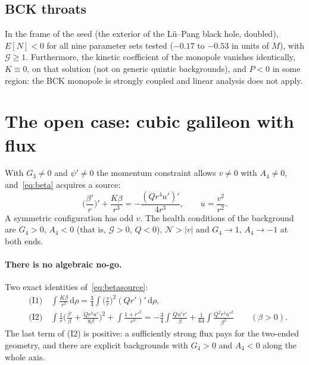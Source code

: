 \documentclass[11pt,a4paper]{article}
\theoremstyle{remark}
\newcommand{\G}{\mathcal G}
\newcommand{\Ncal}{\mathcal N}
\newcommand{\dd}{\mathrm d}
\begin{document}
\subsection{BCK throats}\label{sec:BCK}

In the frame of the seed (the exterior of the Lü--Pang black hole, doubled), $E[N]<0$ for all nine parameter sets tested ($-0.17$ to $-0.53$ in units of $M$), with $\G\ge1$. Furthermore, the kinetic coefficient of the monopole vanishes identically, $K\equiv0$, on that solution (not on generic quintic backgrounds), and $P<0$ in some region: the BCK monopole is strongly coupled and linear analysis does not apply.

\section{The open case: cubic galileon with flux}\label{sec:cubic}

With $G_3\neq0$ and $\psi'\neq0$ the momentum constraint allows $v\neq0$ with $A_4\neq0$, and~\eqref{eq:beta} acquires a source:
\begin{equation}
\Big(\frac{\beta'}r\Big)'+\frac{K\beta}{r^3}=-\frac{(Qr^4u')'}{4r^3},\qquad u=\frac{v^2}{r^2}.
\label{eq:betasource}
\end{equation}
A symmetric configuration has odd $v$. The health conditions of the background are $G_4>0$, $A_4<0$ (that is, $\G>0$, $Q<0$), $\Ncal>|v|$ and $G_4\to1$, $A_4\to-1$ at both ends.

\paragraph{There is no algebraic no-go.} Two exact identities of~\eqref{eq:betasource}:
\begin{align}
&\text{(I1)}\quad \int\frac{K\beta}{r^3}\,\dd\rho=\frac34\int\Big(\frac vr\Big)^2(Qr')'\,\dd\rho,\\
&\text{(I2)}\quad \int\frac1r\Big(\frac{\beta'}\beta+\frac{Qr^2u'}{8\beta}\Big)^2+\int\frac{1+r'^2}{r^3}=-\frac34\int\frac{Qu'r'}\beta+\frac1{64}\int\frac{Q^2r^3u'^2}{\beta^2}\qquad(\beta>0).
\end{align}
The last term of (I2) is positive: a sufficiently strong flux pays for the two-ended geometry, and there are explicit backgrounds with $G_4>0$ and $A_4<0$ along the whole axis.
\end{document}
